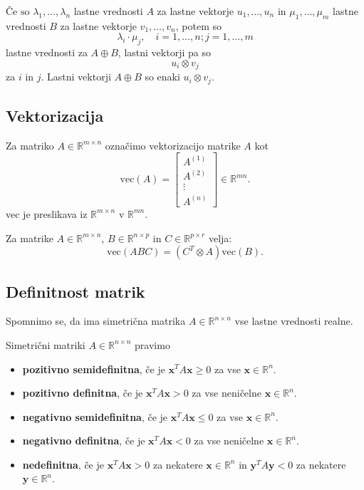\documentclass{article}
\begin{document}
\begin{multicols}{2}
	\(\text{Če so } \lambda_1, \ldots, \lambda_n \) lastne vrednosti \( A \) za lastne vektorje \( u_1, \ldots, u_n \) in \( \mu_1, \ldots, \mu_m \) lastne vrednosti \( B \) za lastne vektorje \( v_1, \ldots, v_n \), potem so
	\[ \lambda_i \cdot \mu_j, \quad i = 1, \ldots, n; j = 1, \ldots, m \]
	lastne vrednosti za \( A \oplus B \), lastni vektorji pa so
	\[ u_i \otimes v_j \]
	za \( i \) in \( j \). Lastni vektorji \( A \oplus B \) so enaki \( u_i \otimes v_j \).


	\subsection{Vektorizacija}

	Za matriko \( A \in \mathbb{R}^{m \times n} \) označimo vektorizacijo matrike \( A \) kot
	\[
		\text{vec}(A) = \begin{bmatrix}
			A^{(1)} \\
			A^{(2)} \\
			\vdots  \\
			A^{(n)}
		\end{bmatrix} \in \mathbb{R}^{mn}.
	\]
	vec je preslikava iz \( \mathbb{R}^{m \times n} \) v \( \mathbb{R}^{mn} \).

	Za matrike \( A \in \mathbb{R}^{m \times n} \), \( B \in \mathbb{R}^{n \times p} \) in \( C \in \mathbb{R}^{p \times r} \) velja:
	\[
		\text{vec}(ABC) = (C^T \otimes A)\text{vec}(B).
	\]

	\subsection{Definitnost matrik}

	Spomnimo se, da ima simetrična matrika \( A \in \mathbb{R}^{n \times n} \) vse lastne vrednosti realne.

	Simetrični matriki \( A \in \mathbb{R}^{n \times n} \) pravimo
	\begin{itemize}
		\item \textbf{pozitivno semidefinitna}, če je \( \mathbf{x}^T A \mathbf{x} \geq 0 \) za vse \( \mathbf{x} \in \mathbb{R}^n \).
		\item \textbf{pozitivno definitna}, če je \( \mathbf{x}^T A \mathbf{x} > 0 \) za vse neničelne \( \mathbf{x} \in \mathbb{R}^n \).
		\item \textbf{negativno semidefinitna}, če je \( \mathbf{x}^T A \mathbf{x} \leq 0 \) za vse \( \mathbf{x} \in \mathbb{R}^n \).
		\item \textbf{negativno definitna}, če je \( \mathbf{x}^T A \mathbf{x} < 0 \) za vse neničelne \( \mathbf{x} \in \mathbb{R}^n \).
		\item \textbf{nedefinitna}, če je \( \mathbf{x}^T A \mathbf{x} > 0 \) za nekatere \( \mathbf{x} \in \mathbb{R}^n \) in \( \mathbf{y}^T A \mathbf{y} < 0 \) za nekatere \( \mathbf{y} \in \mathbb{R}^n \).
	\end{itemize}


\end{multicols}
\end{document}
